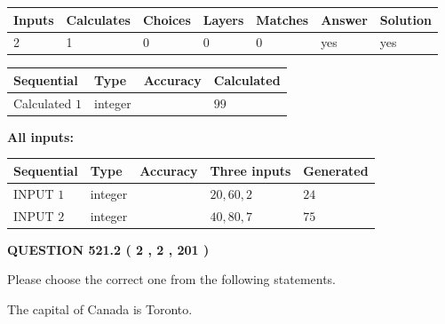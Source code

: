 \documentclass[12pt]{article}
\begin{document}
 

 
   
   
   
   
\noindent\begin{tabular}{|l|l|l|l|l|l|l|}
 \hline
Inputs & Calculates & Choices & Layers & Matches & Answer & Solution \\ \hline
 2  & 
 1  & 
 0
  & 
 0  & 
 0  & 
  yes & 
  yes 
  \\ \hline
 \end{tabular}
   
   
   
   
\noindent{}
   
   
  
  
\noindent\begin{tabular}{|l|l|l|l|}
\hline
 Sequential & Type & Accuracy & Calculated \\ 
\hline
 
 
  Calculated $  1 $ & integer &  & 
  $ 99 $ 
 \\  \hline  
 \end{tabular}
   
   
   
   
\noindent\vspace{0.1in}\hspace{-0.08in} {\textbf{\Large{All inputs: }}}
   
   
  
  
\noindent\begin{tabular}{|l|l|l|l|l|}
\hline
 Sequential & Type & Accuracy & Three inputs & Generated \\ 
\hline
 
 
  INPUT $  1 $ & integer &  & $
 20
 , 
 60
 , 
 2
 $ & $ 24 $ 
 \\  \hline  
 
 
  INPUT $  2 $ & integer &  & $
 40
 , 
 80
 , 
 7
 $ & $ 75 $ 
 \\  \hline  
 \end{tabular}
   
   
  
\vspace{0.2in}
  
{\textbf{\Large{QUESTION
521.2 
 ( 2 , 2 , 201 )
}}}
  
  
Please choose the correct one from the following statements.
 
 
The capital of Canada is Toronto.
 
\end{document}
